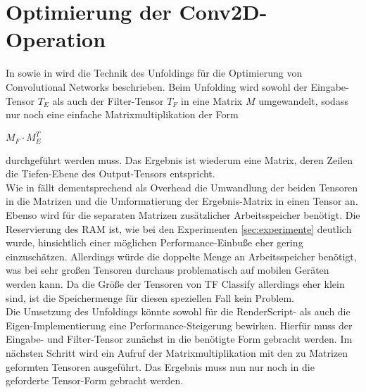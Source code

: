 \section{Optimierung der Conv2D-Operation}
\label{sec:optimierungconv2d}
In \cite{conv2d-optimizing-unfolding} sowie in \cite{Rajbhandari:2017:OCM:3037697.3037745} wird die Technik des Unfoldings für die Optimierung von Convolutional Networks beschrieben. Beim Unfolding wird sowohl der Eingabe-Tensor $T_{E}$ als auch der Filter-Tensor $T_{F}$ in eine Matrix $M$ umgewandelt, sodass nur noch eine einfache Matrixmultiplikation der Form 
\begin{center}
	$M_{F} \cdot M_{E}^{T}$
\end{center}
durchgeführt werden muss. Das Ergebnis ist wiederum eine Matrix, deren Zeilen die Tiefen-Ebene des Output-Tensors entspricht. 
\\
Wie in \cite{conv2d-optimizing-unfolding} fällt dementsprechend als Overhead die Umwandlung der beiden Tensoren in die Matrizen und die Umformatierung der Ergebnis-Matrix in einen Tensor an. Ebenso wird für die separaten Matrizen zusätzlicher Arbeitsspeicher benötigt. Die Reservierung des RAM ist, wie bei den Experimenten \ref{sec:experimente} deutlich wurde, hinsichtlich einer möglichen Performance-Einbuße eher gering einzuschätzen. Allerdings würde die doppelte Menge an Arbeitsspeicher benötigt, was bei sehr großen Tensoren durchaus problematisch auf mobilen Geräten werden kann. Da die Größe der Tensoren von TF Classify allerdings eher klein sind, ist die Speichermenge für diesen speziellen Fall kein Problem. 
\\
Die Umsetzung des Unfoldings könnte sowohl für die RenderScript- als auch die Eigen-Implementierung eine Performance-Steigerung bewirken. Hierfür muss der Eingabe- und Filter-Tensor zunächst in die benötigte Form gebracht werden. Im nächsten Schritt wird ein Aufruf der Matrixmultiplikation mit den zu Matrizen geformten Tensoren ausgeführt. Das Ergebnis muss nun nur noch in die geforderte Tensor-Form gebracht werden. 
